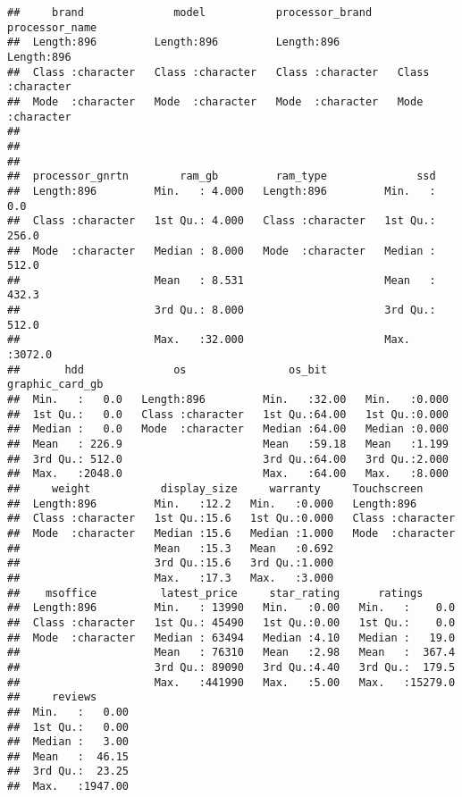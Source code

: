 \documentclass[
]{article}
\begin{document}
\begin{verbatim}
##     brand              model           processor_brand    processor_name    
##  Length:896         Length:896         Length:896         Length:896        
##  Class :character   Class :character   Class :character   Class :character  
##  Mode  :character   Mode  :character   Mode  :character   Mode  :character  
##                                                                             
##                                                                             
##                                                                             
##  processor_gnrtn        ram_gb         ram_type              ssd        
##  Length:896         Min.   : 4.000   Length:896         Min.   :   0.0  
##  Class :character   1st Qu.: 4.000   Class :character   1st Qu.: 256.0  
##  Mode  :character   Median : 8.000   Mode  :character   Median : 512.0  
##                     Mean   : 8.531                      Mean   : 432.3  
##                     3rd Qu.: 8.000                      3rd Qu.: 512.0  
##                     Max.   :32.000                      Max.   :3072.0  
##       hdd              os                os_bit      graphic_card_gb
##  Min.   :   0.0   Length:896         Min.   :32.00   Min.   :0.000  
##  1st Qu.:   0.0   Class :character   1st Qu.:64.00   1st Qu.:0.000  
##  Median :   0.0   Mode  :character   Median :64.00   Median :0.000  
##  Mean   : 226.9                      Mean   :59.18   Mean   :1.199  
##  3rd Qu.: 512.0                      3rd Qu.:64.00   3rd Qu.:2.000  
##  Max.   :2048.0                      Max.   :64.00   Max.   :8.000  
##     weight           display_size     warranty     Touchscreen       
##  Length:896         Min.   :12.2   Min.   :0.000   Length:896        
##  Class :character   1st Qu.:15.6   1st Qu.:0.000   Class :character  
##  Mode  :character   Median :15.6   Median :1.000   Mode  :character  
##                     Mean   :15.3   Mean   :0.692                     
##                     3rd Qu.:15.6   3rd Qu.:1.000                     
##                     Max.   :17.3   Max.   :3.000                     
##    msoffice          latest_price     star_rating      ratings       
##  Length:896         Min.   : 13990   Min.   :0.00   Min.   :    0.0  
##  Class :character   1st Qu.: 45490   1st Qu.:0.00   1st Qu.:    0.0  
##  Mode  :character   Median : 63494   Median :4.10   Median :   19.0  
##                     Mean   : 76310   Mean   :2.98   Mean   :  367.4  
##                     3rd Qu.: 89090   3rd Qu.:4.40   3rd Qu.:  179.5  
##                     Max.   :441990   Max.   :5.00   Max.   :15279.0  
##     reviews       
##  Min.   :   0.00  
##  1st Qu.:   0.00  
##  Median :   3.00  
##  Mean   :  46.15  
##  3rd Qu.:  23.25  
##  Max.   :1947.00
\end{verbatim}
\end{document}
